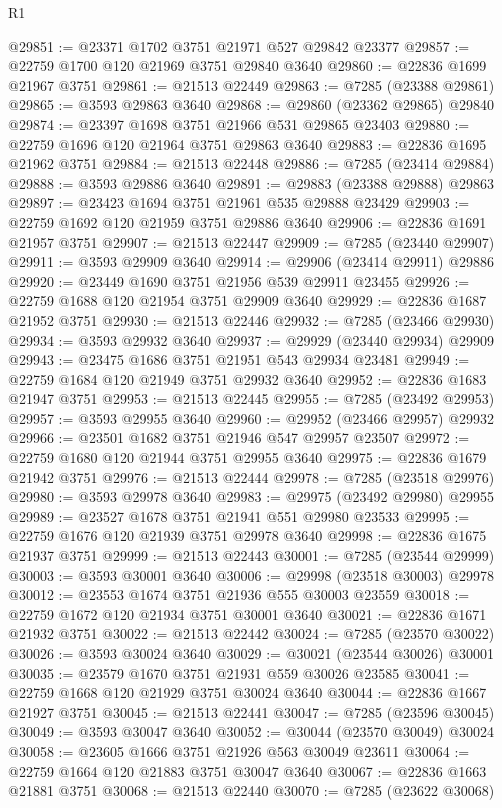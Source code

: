 \begin{lexlean}{R1}
\begin{coremodule}
@29851 := @23371 @1702 @3751 @21971 @527 @29842 @23377
@29857 := @22759 @1700 @120 @21969 @3751 @29840 @3640
@29860 := @22836 @1699 @21967 @3751
@29861 := @21513 @22449
@29863 := @7285 (@23388 @29861)
@29865 := @3593 @29863 @3640
@29868 := @29860 (@23362 @29865) @29840
@29874 := @23397 @1698 @3751 @21966 @531 @29865 @23403
@29880 := @22759 @1696 @120 @21964 @3751 @29863 @3640
@29883 := @22836 @1695 @21962 @3751
@29884 := @21513 @22448
@29886 := @7285 (@23414 @29884)
@29888 := @3593 @29886 @3640
@29891 := @29883 (@23388 @29888) @29863
@29897 := @23423 @1694 @3751 @21961 @535 @29888 @23429
@29903 := @22759 @1692 @120 @21959 @3751 @29886 @3640
@29906 := @22836 @1691 @21957 @3751
@29907 := @21513 @22447
@29909 := @7285 (@23440 @29907)
@29911 := @3593 @29909 @3640
@29914 := @29906 (@23414 @29911) @29886
@29920 := @23449 @1690 @3751 @21956 @539 @29911 @23455
@29926 := @22759 @1688 @120 @21954 @3751 @29909 @3640
@29929 := @22836 @1687 @21952 @3751
@29930 := @21513 @22446
@29932 := @7285 (@23466 @29930)
@29934 := @3593 @29932 @3640
@29937 := @29929 (@23440 @29934) @29909
@29943 := @23475 @1686 @3751 @21951 @543 @29934 @23481
@29949 := @22759 @1684 @120 @21949 @3751 @29932 @3640
@29952 := @22836 @1683 @21947 @3751
@29953 := @21513 @22445
@29955 := @7285 (@23492 @29953)
@29957 := @3593 @29955 @3640
@29960 := @29952 (@23466 @29957) @29932
@29966 := @23501 @1682 @3751 @21946 @547 @29957 @23507
@29972 := @22759 @1680 @120 @21944 @3751 @29955 @3640
@29975 := @22836 @1679 @21942 @3751
@29976 := @21513 @22444
@29978 := @7285 (@23518 @29976)
@29980 := @3593 @29978 @3640
@29983 := @29975 (@23492 @29980) @29955
@29989 := @23527 @1678 @3751 @21941 @551 @29980 @23533
@29995 := @22759 @1676 @120 @21939 @3751 @29978 @3640
@29998 := @22836 @1675 @21937 @3751
@29999 := @21513 @22443
@30001 := @7285 (@23544 @29999)
@30003 := @3593 @30001 @3640
@30006 := @29998 (@23518 @30003) @29978
@30012 := @23553 @1674 @3751 @21936 @555 @30003 @23559
@30018 := @22759 @1672 @120 @21934 @3751 @30001 @3640
@30021 := @22836 @1671 @21932 @3751
@30022 := @21513 @22442
@30024 := @7285 (@23570 @30022)
@30026 := @3593 @30024 @3640
@30029 := @30021 (@23544 @30026) @30001
@30035 := @23579 @1670 @3751 @21931 @559 @30026 @23585
@30041 := @22759 @1668 @120 @21929 @3751 @30024 @3640
@30044 := @22836 @1667 @21927 @3751
@30045 := @21513 @22441
@30047 := @7285 (@23596 @30045)
@30049 := @3593 @30047 @3640
@30052 := @30044 (@23570 @30049) @30024
@30058 := @23605 @1666 @3751 @21926 @563 @30049 @23611
@30064 := @22759 @1664 @120 @21883 @3751 @30047 @3640
@30067 := @22836 @1663 @21881 @3751
@30068 := @21513 @22440
@30070 := @7285 (@23622 @30068)

\end{coremodule}
\end{lexlean}

